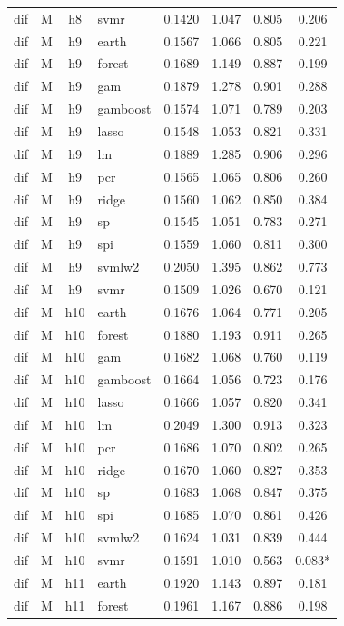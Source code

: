 \begin{ThreePartTable}
\begin{longtable}[t]{llclcccc}
dif & M & h8 & svmr & 0.1420 & 1.047 & 0.805 & 0.206\\
\addlinespace
dif & M & h9 & earth & 0.1567 & 1.066 & 0.805 & 0.221\\
dif & M & h9 & forest & 0.1689 & 1.149 & 0.887 & 0.199\\
dif & M & h9 & gam & 0.1879 & 1.278 & 0.901 & 0.288\\
dif & M & h9 & gamboost & 0.1574 & 1.071 & 0.789 & 0.203\\
dif & M & h9 & lasso & 0.1548 & 1.053 & 0.821 & 0.331\\
dif & M & h9 & lm & 0.1889 & 1.285 & 0.906 & 0.296\\
dif & M & h9 & pcr & 0.1565 & 1.065 & 0.806 & 0.260\\
dif & M & h9 & ridge & 0.1560 & 1.062 & 0.850 & 0.384\\
dif & M & h9 & sp & 0.1545 & 1.051 & 0.783 & 0.271\\
dif & M & h9 & spi & 0.1559 & 1.060 & 0.811 & 0.300\\
dif & M & h9 & svmlw2 & 0.2050 & 1.395 & 0.862 & 0.773\\
dif & M & h9 & svmr & 0.1509 & 1.026 & 0.670 & 0.121\\
\addlinespace
dif & M & h10 & earth & 0.1676 & 1.064 & 0.771 & 0.205\\
dif & M & h10 & forest & 0.1880 & 1.193 & 0.911 & 0.265\\
dif & M & h10 & gam & 0.1682 & 1.068 & 0.760 & 0.119\\
dif & M & h10 & gamboost & 0.1664 & 1.056 & 0.723 & 0.176\\
dif & M & h10 & lasso & 0.1666 & 1.057 & 0.820 & 0.341\\
dif & M & h10 & lm & 0.2049 & 1.300 & 0.913 & 0.323\\
dif & M & h10 & pcr & 0.1686 & 1.070 & 0.802 & 0.265\\
dif & M & h10 & ridge & 0.1670 & 1.060 & 0.827 & 0.353\\
dif & M & h10 & sp & 0.1683 & 1.068 & 0.847 & 0.375\\
dif & M & h10 & spi & 0.1685 & 1.070 & 0.861 & 0.426\\
dif & M & h10 & svmlw2 & 0.1624 & 1.031 & 0.839 & 0.444\\
dif & M & h10 & svmr & 0.1591 & 1.010 & 0.563 & 0.083*\\
\addlinespace
dif & M & h11 & earth & 0.1920 & 1.143 & 0.897 & 0.181\\
dif & M & h11 & forest & 0.1961 & 1.167 & 0.886 & 0.198\\

\end{longtable}
\end{ThreePartTable}
